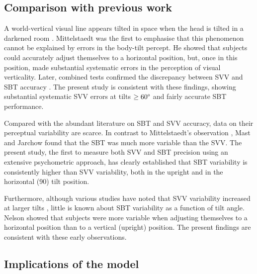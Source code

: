 \subsection{Comparison with previous work}
 
A world-vertical visual line appears tilted in space when the head is tilted in a darkened room \cite{aubert1861}. Mittelstaedt \citeyear{mittelstaedt1983} was the first to emphasise that this phenomenon cannot be explained by errors in the body-tilt percept. He showed that subjects could accurately adjust themselves to a horizontal position, but, once in this position, made substantial systematic errors in the perception of visual verticality. Later, combined tests confirmed the discrepancy between SVV and SBT accuracy \cite{mast1996, jarchow1999, vanbeuzekom2000, vanbeuzekom2001, kaptein2004, vingerhoets2008}. The present study is consistent with these findings, showing substantial systematic SVV errors at tilts $\ge60\degree$ and fairly accurate SBT performance. 

Compared with the abundant literature on SBT and SVV accuracy, data on their perceptual variability are scarce. In contrast to Mittelstaedt's observation \citeyear{mittelstaedt1983}, Mast and Jarchow \citeyear{mast1996} found that the SBT was much more variable than the SVV. The present study, the first to measure both SVV and SBT precision using an extensive psychometric approach, has clearly established that SBT variability is consistently higher than SVV variability, both in the upright and in the horizontal (90\textdegree) tilt position. 

Furthermore, although various studies have noted that SVV variability increased at larger tilts \cite{schone1964, schone1968, udodehaes1970, vanbeuzekom2001, devrijer2008}, little is known about SBT variability as a function of tilt angle. Nelson \citeyear{nelson1968} showed that subjects were more variable when adjusting themselves to a horizontal position than to a vertical (upright) position. The present findings are consistent with these early observations. 


\subsection{Implications of the model}
 
